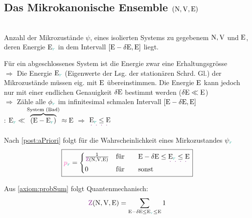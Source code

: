 \subsection{Das Mikrokanonische Ensemble $(\mathrm{N},\mathrm{V},\mathrm{E})$}
\label{subsec:MikrokanonischeEnsemble}
\begin{defnbox}\nospacing
  \begin{defn}[\\Mikrokanonisches Zustandssumme \tc{black}{$\Zz=\Zz(\Nz,\Vz,\Ez)$}]\leavevmode\\
    Anzahl der Mikrozustände $\psi$, eines isolierten Systems zu gegebenem $\mathrm{N},\mathrm{V}$ und $\mathrm{E}$,
    deren Energie $\Ez_{\idxr}$ in dem Intervall $[\mathrm{E}-\delta\mathrm{E},\mathrm{E}]$ liegt.
  \end{defn}
\end{defnbox}
\begin{notebox}[Bemerkung]
  Für ein abgeschlossenes System ist die Energie zwar eine Erhaltungsgrösse\\
  $\Rightarrow$ Die Energie $\Ezr$ (Eigenwerte der Lsg. der stationären Schrd. Gl.) der Mikrozustände müssen eig. mit $\mathrm{E}$ übereinstimmen.
  Die Energie $\mathrm{E}$ kann jedoch nur mit einer endlichen Genauigkeit $\delta\mathrm{E}$
  bestimmt werden ($\delta\mathrm{E}\ll\mathrm{E}$)\\
  $\Rightarrow$ Zähle alle $\phi_{\idxr}$ im infinitesimal schmalen Intervall
  $[\mathrm{E}-\delta\mathrm{E},\mathrm{E}]$\\
  : $\Ezr\ll\overbrace{(\Ez-\Ezr)}^{\text{System (Bad)}}\approx\Ez$ $\Rightarrow$ $\uldotted[ulc4]{\Ezr\leq\Ez}$
\end{notebox}
\begin{emphbox}\nospacing
  \begin{law}
    Nach \cref{post:aPriori} folgt für die Wahrscheinlichkeit eines Mirkozustandes $\psi_{\idxr}$
    \begin{equation}\label{eq:mikrokanonischeWahr}
      \boxed{\pbr=
        \begin{cases}
          \frac{1}{\Zz(\Nz,\Vz,\Ez)} &\mbox{für}\qquad \Ez-\delta\Ez\leq\uldotted[ulc4]{\Ezr\le\Ez} \\
          0 &\mbox{für}\qquad \text{sonst}
        \end{cases}}
      \end{equation}
  \end{law}
\end{emphbox}
\begin{emphbox}\nospacing
  \begin{law}
    Aus \cref{axiom:probSum} folgt Quantenmechanisch:
    \begin{equation}
      \Zzm=\sum_{\Ez-\delta\Ez\le\Ezr\leq\Ez}1
    \end{equation}
  \end{law}
\end{emphbox}
